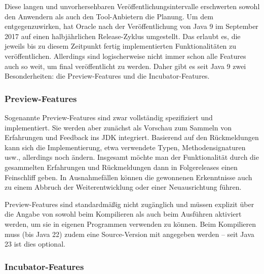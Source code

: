 Diese langen und unvorhersehbaren Veröffentlichungsintervalle erschwerten sowohl den Anwendern
als auch den Tool-Anbietern die Planung. Um dem entgegenzuwirken, hat Oracle nach der Veröffentlichung
von Java 9 im September 2017 auf einen halbjährlichen Release-Zyklus umgestellt. Das erlaubt es,
die jeweils bis zu diesem Zeitpunkt fertig implementierten Funktionalitäten zu veröffentlichen.
Allerdings sind logischerweise nicht immer schon alle Features auch so weit, um final
veröffentlicht zu werden. Daher gibt es seit Java 9 zwei Besonderheiten:
die  Preview-Features und  die Incubator-Features.




\subsubsection{Preview-Features}
\label{subsubsec:Preview-Features}


Sogenannte Preview-Features sind zwar vollständig spezifiziert und implementiert.
Sie werden aber zunächst als Vorschau zum Sammeln von Erfahrungen und Feedback ins
JDK integriert. Basierend auf den Rückmeldungen kann sich die Implementierung,
etwa verwendete Typen, Methodensignaturen usw., allerdings noch ändern.
Insgesamt möchte man der Funktionalität durch die gesammelten Erfahrungen und Rückmeldungen
dann in Folgereleases einen Feinschliff  geben. In Ausnahmefällen können die gewonnenen Erkenntnisse auch zu
 einem Abbruch der Weiterentwicklung oder einer Neuausrichtung führen.


Preview-Features  sind standardmäßig nicht zugänglich
und müssen explizit über die Angabe von \code{-}
sowohl beim Kompilieren als auch beim Ausführen  aktiviert werden, um
sie in eigenen Programmen verwenden zu können.
Beim Kompilieren  muss (bis Java 22) zudem eine Source-Version
 mit  \code{-} angegeben werden --
seit Java 23 ist dies optional.




\subsubsection{Incubator-Features}


